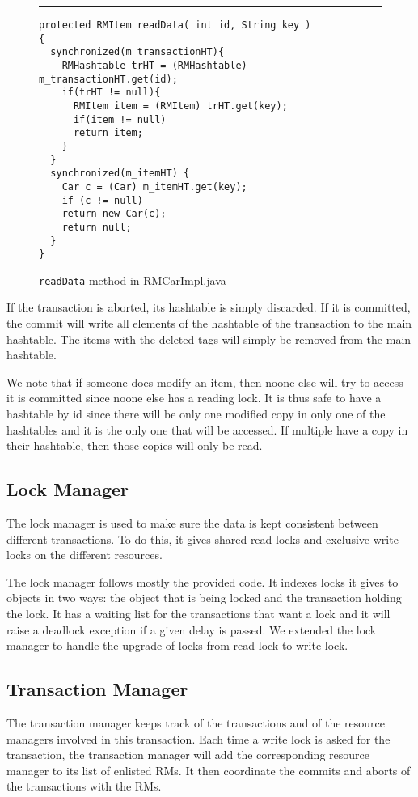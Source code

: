 \documentclass[12pt]{article}
\theoremstyle{plain}%
\theoremstyle{definition}
\theoremstyle{remark}
\newcommand{\java}[1]{{\lstinline!#1!}}
\newenvironment{figureone}[1]{%
  \def\deffigurecaption{#1}%
  \begin{figure}[htbp]%
  \begin{center}%
  \begin{minipage}{\columnwidth}%
  \hrule \vspace*{2ex}%
}{%
  \end{minipage}%
  \end{center}%
  \caption{\deffigurecaption}%
  \end{figure}%
}
\begin{document}
\begin{figureone}{\java{readData} method in RMCarImpl.java \label{fig:readdata}}
\begin{lstlisting}
protected RMItem readData( int id, String key )
{
  synchronized(m_transactionHT){
    RMHashtable trHT = (RMHashtable) m_transactionHT.get(id);
    if(trHT != null){
      RMItem item = (RMItem) trHT.get(key);
      if(item != null)
      return item;
    }
  }
  synchronized(m_itemHT) {
    Car c = (Car) m_itemHT.get(key);
    if (c != null)
    return new Car(c);
    return null;
  }
}
\end{lstlisting}
\end{figureone}

If the transaction is aborted, its hashtable is simply discarded. If 
it is committed, the commit will write all elements of the hashtable 
of the transaction to the main hashtable. The items with the deleted 
tags will simply be removed from the main hashtable.

We note that if someone does modify an item, then noone else will try 
to access it is committed since noone else has a reading lock. It is 
thus safe to have a hashtable by id since there will be only one modified 
copy in only one of the hashtables and it is the only one that will be 
accessed. If multiple have a copy in their hashtable, then those copies 
will only be read.

\subsection{Lock Manager}

The lock manager is used to make sure the data is kept consistent
between different transactions. To do this, it gives shared read locks
and exclusive write locks on the different resources.

The lock manager follows mostly the provided code. It indexes locks it 
gives to objects in two ways: the object that is being locked and the 
transaction holding the lock. It has a waiting list for the transactions 
that want a lock and it will raise a deadlock exception if a given delay 
is passed. We extended the lock manager to handle the upgrade of locks 
from read lock to write lock.

\subsection{Transaction Manager}

The transaction manager keeps track of the transactions and of the 
resource managers involved in this transaction. Each time a write lock
is asked for the transaction, the transaction manager will add the
corresponding resource manager to its list of enlisted RMs. It then
coordinate the commits and aborts of the transactions with the RMs.
\end{document}
